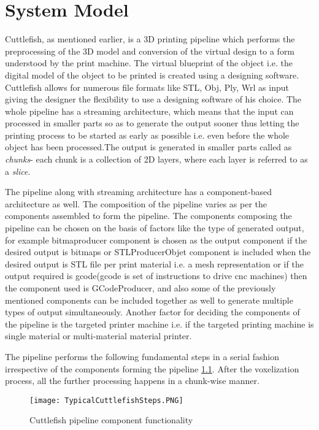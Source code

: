 \chapter{System Model}
Cuttlefish, as mentioned earlier, is a 3D printing pipeline which performs the preprocessing of the 3D model and conversion of the virtual design to a form understood by the print machine. The virtual blueprint of the object i.e. the digital model of the object to be printed is created using a designing software. Cuttlefish allows for numerous file formats like STL, Obj, Ply, Wrl as input giving the designer the flexibility to use a designing software of his choice. The whole pipeline has a streaming architecture, which means that the input can processed in smaller parts so as to generate the output sooner thus letting the printing process to be started as early as possible i.e. even before the whole object has been processed.The output is generated in smaller parts called as \textit{chunks}- each chunk is a collection of 2D layers, where each layer is referred to as a \textit{slice}. \newline

The pipeline along with streaming architecture has a component-based architecture as well. The composition of the pipeline varies as per the components assembled to form the pipeline. The components composing the pipeline can be chosen on the basis of factors like the type of generated output, for example bitmaproducer component is chosen as the output component if the desired output is bitmaps or STLProducerObjet component is included when the desired output is STL file per print material i.e. a mesh representation or if the output required is gcode(gcode is set of instructions to drive cnc machines) then the component used is GCodeProducer, and also some of the previously mentioned components can be included together as well to generate multiple types of output simultaneously. Another factor for deciding the components of the pipeline is the targeted printer machine i.e. if the targeted printing machine is single material or multi-material material printer. 
\newline

The pipeline performs the following fundamental steps in a serial fashion irrespective of the components forming the pipeline \ref{fig:TypicalCuttlefishSteps}. After the voxelization process, all the further processing happens in a chunk-wise manner. 

\begin{figure}[ht!]
\centering
\texttt{[image: TypicalCuttlefishSteps.PNG]}
\caption{Cuttlefish pipeline component functionality}
\label{fig:TypicalCuttlefishSteps}
\end{figure}

